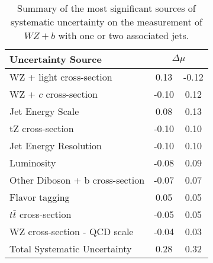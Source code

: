 \begin{table}[H]
    \centering
    \begin{tabular}{l|cc}
        \hline\hline
        Uncertainty Source & \multicolumn{2}{c}{$\Delta \mu$ }  \\
        \hline
        WZ + light cross-section & 0.13 & -0.12 \\
        WZ + $c$ cross-section & -0.10 & 0.12 \\
        Jet Energy Scale & 0.08 & 0.13 \\
        tZ cross-section & -0.10 & 0.10 \\
        Jet Energy Resolution & -0.10 & 0.10 \\
        Luminosity & -0.08 & 0.09 \\
        Other Diboson + b cross-section & -0.07 & 0.07 \\
        Flavor tagging & 0.05 & 0.05 \\
        $t\bar{t}$ cross-section & -0.05 & 0.05 \\
        WZ cross-section - QCD scale & -0.04 & 0.03 \\
        \hline
        Total Systematic Uncertainty & 0.28 & 0.32 \\
        
        \hline\hline
    \end{tabular}
    \caption{Summary of the most significant sources of systematic uncertainty on the measurement of $WZ+b$ with one or two associated jets.}
    \label{tab:systematics_inc}
\end{table}


